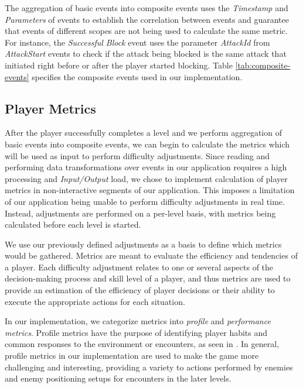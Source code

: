 The aggregation of basic events into composite events uses the \emph{Timestamp} and \emph{Parameters} of events to establish the correlation between events and guarantee that events of different scopes are not being used to calculate the same metric. For instance, the \emph{Successful Block} event uses the parameter \emph{AttackId} from \emph{AttackStart} events to check if the attack being blocked is the same attack that initiated right before or after the player started blocking. Table \ref{tab:composite-events} specifies the composite events used in our implementation. 



\subsection{Player Metrics}

After the player successfully completes a level and we perform aggregation of basic events into composite events, we can begin to calculate the metrics which will be used as input to perform difficulty adjustments. Since reading and performing data transformations over events in our application requires a high processing and \emph{Input/Output} load, we chose to implement calculation of player metrics in non-interactive segments of our application. This imposes a limitation of our application being unable to perform difficulty adjustments in real time. Instead, adjustments are performed on a per-level basis, with metrics being calculated before each level is started.

We use our previously defined adjustments as a basis to define which metrics would be gathered. Metrics are meant to evaluate the efficiency and tendencies of a player. Each difficulty adjustment relates to one or several aspects of the decision-making process and skill level of a player, and thus metrics are used to provide an estimation of the efficiency of player decisions or their ability to execute the appropriate actions for each situation.

In our implementation, we categorize metrics into \emph{profile} and \emph{performance metrics}. Profile metrics have the purpose of identifying player habits and common responses to the environment or encounters, as seen in \cite{ARTICLE_DynamicPlayerModelling}. In general, profile metrics in our implementation are used to make the game more challenging and interesting, providing a variety to actions performed by enemies and enemy positioning setups for encounters in the later levels.

